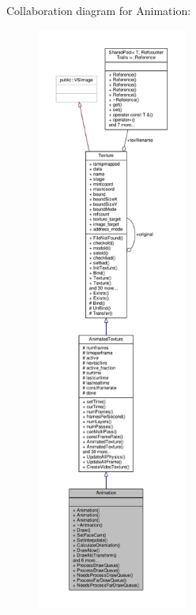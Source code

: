 Collaboration diagram for Animation\+:
\nopagebreak
\begin{figure}[H]
\begin{center}
\leavevmode
\includegraphics[height=550pt]{d1/d1f/classAnimation__coll__graph}
\end{center}
\end{figure}
